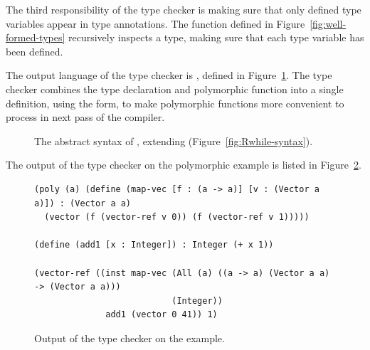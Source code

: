 \documentclass[11pt]{book}
\newcommand{\gray}[1]{{\color{gray} #1}}
\begin{document}
The third responsibility of the type checker is making sure that only
defined type variables appear in type annotations. The
 function defined in
Figure~\ref{fig:well-formed-types} recursively inspects a type, making
sure that each type variable has been defined.

The output language of the type checker is \LangInst{}, defined in
Figure~\ref{fig:Rpoly-prime-syntax}. The type checker combines the type
declaration and polymorphic function into a single definition, using
the  form, to make polymorphic functions more convenient to
process in next pass of the compiler.

\begin{figure}[tp]
\centering
\fbox{
  \begin{minipage}{0.96\textwidth}
\small
\[
\begin{array}{lcl}
  \Type &::=& \ldots \mid \LP\key{All}~\LP\Var\ldots\RP~ \Type\RP \mid \Var \\
  \Exp &::=& \ldots \mid \INST{\Exp}{\Type}{\LP\Type\ldots\RP} \\
  \Def &::=& \gray{ \DEF{\Var}{\LP\LS\Var \key{:} \Type\RS \ldots\RP}{\Type}{\code{'()}}{\Exp} } \\
   &\mid& \LP\key{Poly}~\LP\Var\ldots\RP~ \DEF{\Var}{\LP\LS\Var \key{:} \Type\RS \ldots\RP}{\Type}{\code{'()}}{\Exp}\RP  \\
  \LangInst{} &::=& \gray{ \PROGRAMDEFSEXP{\code{'()}}{\LP\Def\ldots\RP}{\Exp} }
\end{array}
\]
\end{minipage}
}
\caption{The abstract syntax of \LangInst{}, extending \LangLoop{}
    (Figure~\ref{fig:Rwhile-syntax}).}
\label{fig:Rpoly-prime-syntax}
\end{figure}

The output of the type checker on the polymorphic 
example is listed in Figure~\ref{fig:map-vec-type-check}.

\begin{figure}[tbp]
\begin{lstlisting}
(poly (a) (define (map-vec [f : (a -> a)] [v : (Vector a a)]) : (Vector a a)
  (vector (f (vector-ref v 0)) (f (vector-ref v 1)))))

(define (add1 [x : Integer]) : Integer (+ x 1))

(vector-ref ((inst map-vec (All (a) ((a -> a) (Vector a a) -> (Vector a a)))
                           (Integer))
              add1 (vector 0 41)) 1)
\end{lstlisting}
\caption{Output of the type checker on the  example.}
\label{fig:map-vec-type-check}
\end{figure}
\end{document}
